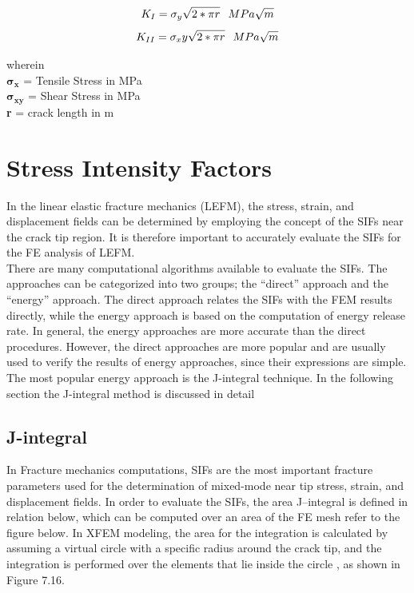\documentclass[fleqn, 12.5pt,a4paper]{report}
\newcommand\tab[1][1cm]{\hspace*{#1}}
\begin{document}
$$K_I = \sigma_y \sqrt{2*\pi r} \tab[0.25cm] MPa\sqrt{m}$$
$$K_{II} = \sigma_xy \sqrt{2*\pi r} \tab[0.25cm] MPa\sqrt{m}$$

wherein
\\
\tab[1cm] $\mathbold{\sigma_{x}}$ = Tensile Stress in MPa
\\
\tab[1cm] $\mathbold{\sigma_{xy}}$ = Shear Stress in MPa
\\
\tab[1cm] \textbf{r} = crack length in m

\section{\color{Black} \large{Stress Intensity Factors}}

In the linear elastic fracture mechanics (LEFM), the stress, strain, and displacement fields can be determined by employing the concept of the SIFs near the crack tip region. It is therefore important to accurately evaluate the SIFs for the FE analysis of LEFM.\\

There are many computational algorithms available to evaluate the SIFs. The approaches can be categorized into two groups; the “direct” approach and the “energy” approach. The direct approach relates the SIFs with the FEM results directly, while the energy approach is based on the computation of energy release rate. In general, the energy approaches are more accurate than the direct procedures. However, the direct approaches are more popular and are usually used to verify the results of energy approaches, since their expressions are simple. The most popular energy approach is the J-integral technique\cite{khoei2014extended}. In the following section the J-integral method is discussed in detail

\subsection{\color{Black} \large{J-integral}}
In Fracture mechanics computations, SIFs are the most important fracture parameters used for the determination of mixed-mode near tip stress, strain, and displacement fields. In order to evaluate the SIFs, the area J–integral is defined in relation below, which can be computed over an area of the FE mesh refer to the figure below. In XFEM modeling, the area for the integration is calculated by assuming a virtual circle with a specific radius around the crack tip, and the integration is performed over the elements that lie inside the circle \cite{kuna2013finite}, as shown in Figure 7.16. \newline
\end{document}
